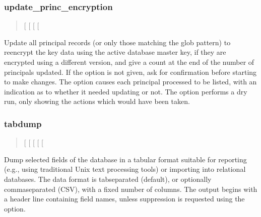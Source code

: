 \documentclass[letterpaper,10pt,english]{sphinxmanual}
\begin{document}
\subsubsection{update\_princ\_encryption}
\label{\detokenize{admin/admin_commands/kdb5_util:update-princ-encryption}}\begin{quote}

\sphinxAtStartPar
{} {[}\sphinxstylestrong{\sphinxhyphen{}f}{]} {[}\sphinxstylestrong{\sphinxhyphen{}n}{]} {[}\sphinxstylestrong{\sphinxhyphen{}v}{]}
{[}\sphinxstyleemphasis{princ\sphinxhyphen{}pattern}{]}
\end{quote}

\sphinxAtStartPar
Update all principal records (or only those matching the
 glob pattern) to re\sphinxhyphen{}encrypt the key data using the
active database master key, if they are encrypted using a different
version, and give a count at the end of the number of principals
updated.  If the  option is not given, ask for confirmation
before starting to make changes.  The  option causes each
principal processed to be listed, with an indication as to whether it
needed updating or not.  The  option performs a dry run, only
showing the actions which would have been taken.


\subsubsection{tabdump}
\label{\detokenize{admin/admin_commands/kdb5_util:tabdump}}\begin{quote}

\sphinxAtStartPar
{} {[}\sphinxstylestrong{\sphinxhyphen{}H}{]} {[}\sphinxstylestrong{\sphinxhyphen{}c}{]} {[}\sphinxstylestrong{\sphinxhyphen{}e}{]} {[}\sphinxstylestrong{\sphinxhyphen{}n}{]} {[} \sphinxstyleemphasis{outfile}{]}
\end{quote}

\sphinxAtStartPar
Dump selected fields of the database in a tabular format suitable for
reporting (e.g., using traditional Unix text processing tools) or
importing into relational databases.  The data format is tab\sphinxhyphen{}separated
(default), or optionally comma\sphinxhyphen{}separated (CSV), with a fixed number of
columns.  The output begins with a header line containing field names,
unless suppression is requested using the  option.
\end{document}
